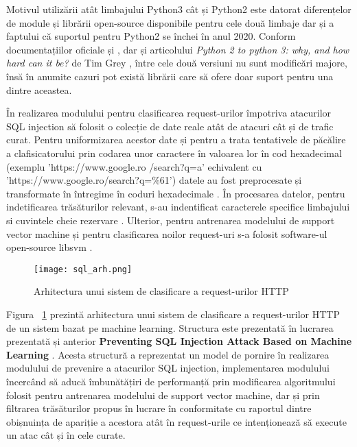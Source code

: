 Motivul utilizării atât limbajului Python3 cât și Python2 este datorat diferențelor de module și librării open-source disponibile pentru cele două limbaje dar și a faptului că suportul pentru Python2 se închei în anul 2020. Conform documentațiilor oficiale  \cite{python3_doc} și \cite{python2_doc}, dar și articolului \textit{Python 2 to python 3: why, and how hard can it be?} de Tim Grey \cite{why_python3},  între cele două versiuni nu sunt modificări majore, însă în anumite cazuri pot există librării care să ofere doar suport pentru una dintre aceastea. 

În realizarea modulului pentru clasificarea request-urilor împotriva atacurilor SQL injection să folosit o colecție de date reale atât de atacuri cât și de trafic curat. Pentru uniformizarea acestor date și pentru a trata tentativele de păcălire a clafisicatorului prin codarea unor caractere în valoarea lor în cod hexadecimal (exemplu 'https://www.google.ro /search?q=a' echivalent cu 'https://www.google.ro/search?q=\%61') datele au fost preprocesate și transformate în întregime în coduri hexadecimale  \cite{ascii}.  În procesarea datelor, pentru indetificarea trăsăturilor relevant, s-au indentificat caracterele specifice limbajului \cite{char_sql} si cuvintele cheie rezervare \cite{key_sql}. Ulterior, pentru antrenarea modelului de support vector machine și pentru clasificarea noilor request-uri s-a folosit software-ul open-source libsvm \cite{libsvm_class}. 

\begin{figure}[h]
	\centering
	\texttt{[image: sql\_arh.png]}
	\caption{Arhitectura unui sistem de clasificare a request-urilor HTTP}
	\label{fig:sql-arh}
\end{figure}

Figura ~\ref{fig:sql-arh}  prezintă arhitectura unui sistem de clasificare a request-urilor HTTP de un sistem bazat pe machine learning. Structura este prezentată în lucrarea prezentată și anterior  \textbf{Preventing SQL Injection Attack Based on Machine Learning} \cite{sqli_how}.  Acesta structură a reprezentat un model de pornire în realizarea modulului de prevenire a atacurilor SQL injection, implementarea modulului încercând să aducă îmbunătățiri de performanță prin modificarea algoritmului folosit pentru antrenarea modelului de support vector machine, dar și prin filtrarea trăsăturilor propus în lucrare în conformitate cu raportul dintre obișnuința de apariție a acestora atât în request-urile ce intenționează să execute un atac cât și în cele curate. 

